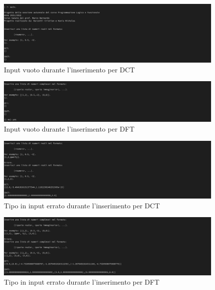 \documentclass{report}
\begin{document}
    \begin{center}
      \begin{figure}
        \includegraphics[width=\textwidth]{test_pl_3.jpg}
        \caption{Input vuoto durante l'inserimento per DCT}
      \end{figure}
    \end{center}

    \begin{center}
      \begin{figure}
        \includegraphics[width=\textwidth]{test_pl_4.jpg}
        \caption{Input vuoto durante l'inserimento per DFT}
      \end{figure}
    \end{center}

    \begin{center}
      \begin{figure}
        \includegraphics[width=\textwidth]{test_pl_5.jpg}
        \caption{Tipo in input errato durante l'inserimento per DCT}
      \end{figure}
    \end{center}

    \begin{center}
      \begin{figure}
        \includegraphics[width=\textwidth]{test_pl_6.jpg}
        \caption{Tipo in input errato durante l'inserimento per DFT}
      \end{figure}
    \end{center}
\end{document}
